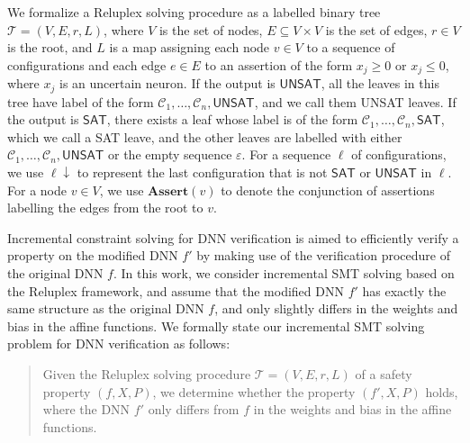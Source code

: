 \documentclass[runningheads]{llncs}
\begin{document}
We formalize a Reluplex solving procedure as a labelled binary tree $\mathcal T=(V,E,r,L)$, where $V$ is the set of nodes, $E \subseteq V \times V$ is the set of edges, $r \in V$ is the root, and $L$ is a map assigning each node $v \in V$ to a sequence of configurations and each edge $e \in E$ to an assertion of the form $x_j \ge 0$ or $x_j \le 0$, where $x_j$ is an uncertain neuron. If the output is $\mathsf{UNSAT}$, all the leaves in this tree have label of the form $\mathcal C_1, \ldots, \mathcal C_n,\mathsf{UNSAT}$, and we call them UNSAT leaves. If the output is $\mathsf{SAT}$, there exists a leaf whose label is of the form $\mathcal C_1, \ldots, \mathcal C_n,\mathsf{SAT}$, which we call a SAT leave, and the other leaves are labelled with either $\mathcal C_1, \ldots, \mathcal C_n,\mathsf{UNSAT}$ or the empty sequence $\varepsilon$. For a sequence $\ell$ of configurations, we use $\ell \downarrow$ to represent the last configuration that is not $\mathsf{SAT}$ or $\mathsf{UNSAT}$ in $\ell$. For a node $v \in V$, we use $\mathbf{Assert}(v)$ to denote the conjunction of assertions labelling the edges from the root to $v$.

Incremental constraint solving for DNN verification is aimed to efficiently verify a property on the modified DNN $f'$ by making use of the verification procedure of the original DNN $f$. In this work, we consider incremental SMT solving based on the Reluplex framework, and assume that the modified DNN $f'$ has exactly the same structure as the original DNN $f$, and only slightly differs in the weights and bias in the affine functions. We formally state our incremental SMT solving problem for DNN verification as follows:

\begin{quote}
    Given the Reluplex solving procedure $\mathcal T=(V,E,r,L)$ of a safety property $(f,X,P)$, we determine whether the property $(f',X,P)$ holds, where the DNN $f'$ only differs from $f$ in the weights and bias in the affine functions.
\end{quote}
\end{document}
